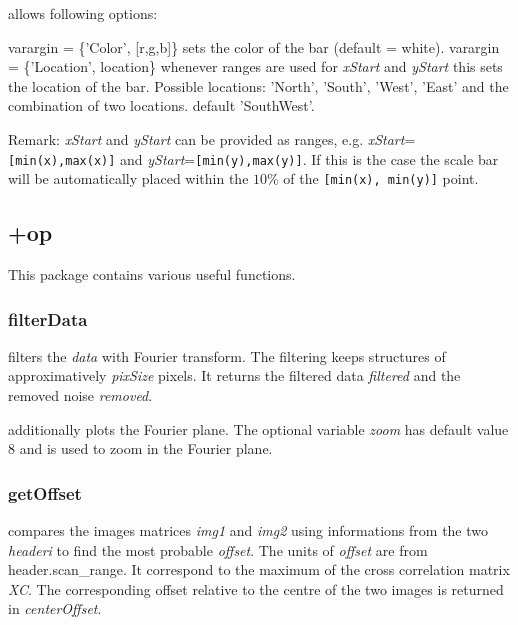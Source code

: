 allows following options:

\bi
\+ varargin = \{'Color', [r,g,b]\} sets the color of the bar (default = white).
\+ varargin = \{'Location', location\} whenever ranges are used for \emph{xStart} and \emph{yStart} this sets the location of the bar. Possible locations: 'North', 'South', 'West', 'East' and the combination of two locations. default 'SouthWest'.
\ei

\edf
Remark: \emph{xStart} and \emph{yStart} can be provided as ranges, e.g. \emph{xStart}=\texttt{[min(x),max(x)]} and \emph{yStart}=\texttt{[min(y),max(y)]}. 
If this is the case the scale bar will be automatically placed within the $10\%$ of the \texttt{[min(x), min(y)]} point.
\subsection{+op}
This package contains various useful functions.
\subsubsection{filterData}
\bdf
{} filters the \emph{data} with Fourier transform. The filtering keeps structures of approximatively \emph{pixSize} pixels. It returns the filtered data \emph{filtered} and the removed noise \emph{removed}.

 additionally plots the Fourier plane. The optional variable \emph{zoom} has default value $8$ and is used to zoom in the Fourier plane.
\edf
\subsubsection{getOffset}
\bdf
{} compares the images matrices \emph{img1} and \emph{img2} using informations from the two \emph{headeri} to find the most probable \emph{offset}. The units of \emph{offset} are from header.scan\_range. It correspond to the maximum of the cross correlation matrix \emph{XC}. The corresponding offset relative to the centre of the two images is returned in \emph{centerOffset}.

